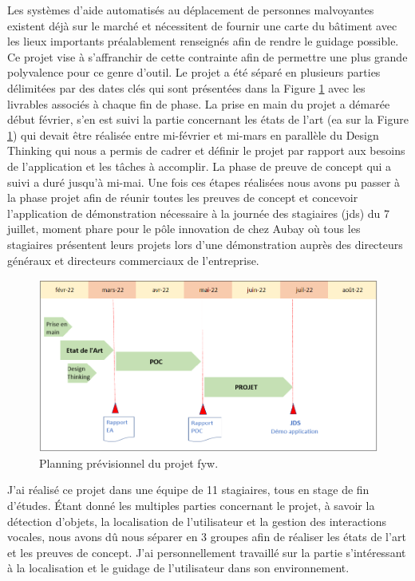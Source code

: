\documentclass[11pt]{article}
\begin{document}
    Les systèmes d'aide automatisés au déplacement de personnes malvoyantes existent déjà sur le marché et nécessitent de fournir une 
    carte du bâtiment avec les lieux importants préalablement renseignés afin de rendre le guidage possible. Ce projet vise à s'affranchir 
    de cette contrainte afin de permettre une plus grande polyvalence pour ce genre d'outil.
    Le projet a été séparé en plusieurs parties délimitées par des dates clés qui sont présentées dans la Figure \ref{fig:Planning} 
    avec les livrables associés à chaque fin de phase.
    La prise en main du projet a démarée début février, s'en est suivi la partie concernant les états de l'art (\acrshort{ea} sur la Figure \ref{fig:Planning}) 
    qui devait être réalisée entre mi-février et mi-mars en parallèle du Design Thinking qui nous a permis de cadrer et définir le projet par 
    rapport aux besoins de l'application et les tâches à accomplir. La phase de preuve de concept qui a suivi a duré jusqu'à mi-mai. 
    Une fois ces étapes réalisées nous avons pu passer à la phase projet afin de réunir toutes les preuves de concept et concevoir l'application 
    de démonstration nécessaire à la journée des stagiaires (\acrshort{jds}) du 7 juillet, moment phare pour le pôle innovation de chez Aubay où tous 
    les stagiaires présentent leurs projets lors d'une démonstration auprès des directeurs généraux et directeurs commerciaux de l'entreprise.

    \begin{figure}[hbt]  
      \includegraphics[width=\textwidth]{Planning.png}    
      \caption{Planning prévisionnel du projet \acrshort{fyw}.}
      \label{fig:Planning}
    \end{figure}  
    
    J'ai réalisé ce projet dans une équipe de 11 stagiaires, tous en stage de fin d'études. Étant donné les multiples parties concernant le projet, 
    à savoir la détection d'objets, la localisation de l'utilisateur et la gestion des interactions vocales, nous avons dû nous séparer en 3 
    groupes afin de réaliser les états de l'art et les preuves de concept. J'ai personnellement travaillé sur la partie s'intéressant à la 
    localisation et le guidage de l'utilisateur dans son environnement. 
    \pagebreak
  
\end{document}
